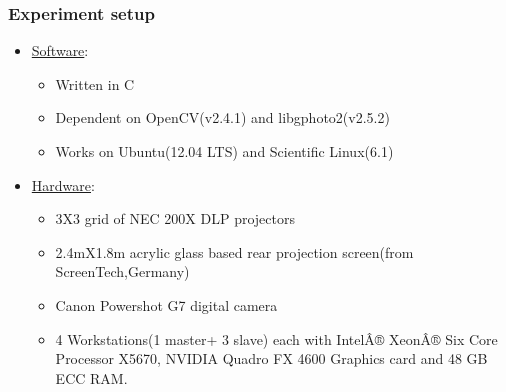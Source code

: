\documentclass[40pt]{beamer}
\begin{document}

\begin{frame}[label=sysconfg]
\frametitle{Experiment setup}
\begin{itemize}
\item \underline{Software}:
\begin{itemize}
\item Written in C
\item Dependent on OpenCV(v2.4.1) and libgphoto2(v2.5.2)
\item Works on Ubuntu(12.04 LTS) and Scientific Linux(6.1)
\end{itemize}      
\item \underline{Hardware}:
\begin{itemize}
\item 3X3 grid of NEC 200X DLP projectors
\item 2.4mX1.8m acrylic glass based rear projection screen(from ScreenTech,Germany)
\item Canon Powershot G7 digital camera
\item 4 Workstations(1 master+ 3 slave) each with IntelÂ® XeonÂ® Six Core Processor X5670, NVIDIA Quadro FX 4600 Graphics card and 48 GB ECC RAM.
\end{itemize}
\end{itemize}
\end{frame}

\end{document}
